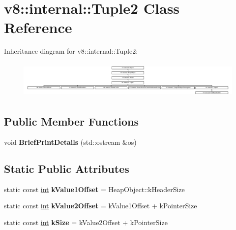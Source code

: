 \hypertarget{classv8_1_1internal_1_1Tuple2}{}\section{v8\+:\+:internal\+:\+:Tuple2 Class Reference}
\label{classv8_1_1internal_1_1Tuple2}
Inheritance diagram for v8\+:\+:internal\+:\+:Tuple2\+:\begin{figure}[H]
\begin{center}
\leavevmode
\includegraphics[height=1.860465cm]{classv8_1_1internal_1_1Tuple2}
\end{center}
\end{figure}
\subsection*{Public Member Functions}
\begin{DoxyCompactItemize}
\item 
\mbox{\label{classv8_1_1internal_1_1Tuple2_ac85b10478584038dfdddf4182fd1f60f}} 
void {\bfseries Brief\+Print\+Details} (std\+::ostream \&os)
\end{DoxyCompactItemize}
\subsection*{Static Public Attributes}
\begin{DoxyCompactItemize}
\item 
\mbox{\label{classv8_1_1internal_1_1Tuple2_a8f64c629c8ec48abcbcf066f6086d140}} 
static const \mbox{\hyperlink{classint}{int}} {\bfseries k\+Value1\+Offset} = Heap\+Object\+::k\+Header\+Size
\item 
\mbox{\label{classv8_1_1internal_1_1Tuple2_aaa588790880642a0a0458e18ee0bd56a}} 
static const \mbox{\hyperlink{classint}{int}} {\bfseries k\+Value2\+Offset} = k\+Value1\+Offset + k\+Pointer\+Size
\item 
\mbox{\label{classv8_1_1internal_1_1Tuple2_aaa7b88ef6c3aa6f0ae9ec3b4f86dc877}} 
static const \mbox{\hyperlink{classint}{int}} {\bfseries k\+Size} = k\+Value2\+Offset + k\+Pointer\+Size
\end{DoxyCompactItemize}
